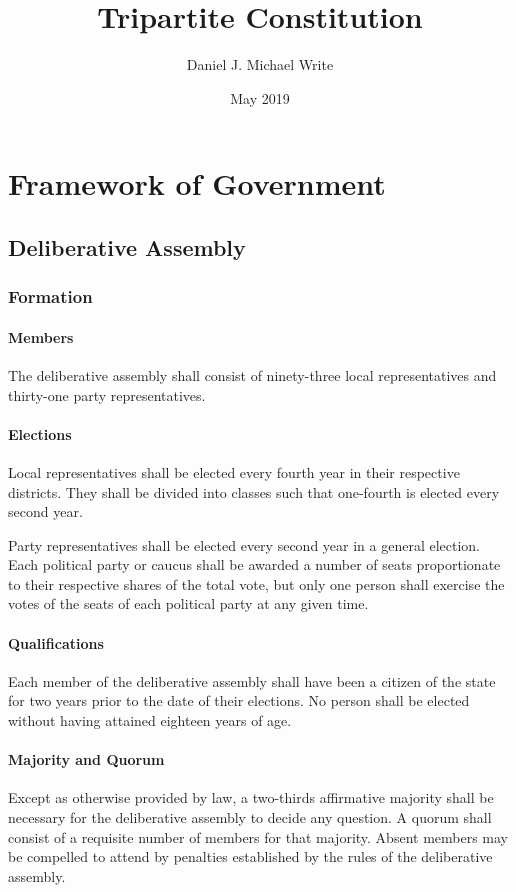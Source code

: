 \documentclass{article}
\title{Tripartite Constitution}
\date{May 2019}
\author{Daniel J. Michael Write}
\begin{document}
\maketitle
\newpage
\tableofcontents
\newpage
\section{Framework of Government}
\subsection{Deliberative Assembly}
\subsubsection{Formation}
\paragraph{Members}
The deliberative assembly shall consist of ninety-three local representatives and thirty-one party representatives.
\paragraph{Elections}
Local representatives shall be elected every fourth year in their respective districts. They shall be divided into classes such that one-fourth is elected every second year.

Party representatives shall be elected every second year in a general election. Each political party or caucus shall be awarded a number of seats proportionate to their respective shares of the total vote, but only one person shall exercise the votes of the seats of each political party at any given time.
\paragraph{Qualifications}
Each member of the deliberative assembly shall have been a citizen of the state for two years prior to the date of their elections. No person shall be elected without having attained eighteen years of age.
\paragraph{Majority and Quorum}
Except as otherwise provided by law, a two-thirds affirmative majority shall be necessary for the deliberative assembly to decide any question. A quorum shall consist of a requisite number of members for that majority. Absent members may be compelled to attend by penalties established by the rules of the deliberative assembly.
\end{document}
